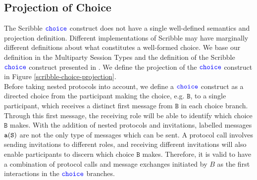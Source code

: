\documentclass[12pt,twoside]{report}
\begin{document}


 


\subsection{Projection of Choice}\label{scr-choice-projection}

The Scribble ${\color{blue}\mathtt{choice}}$ construct does not have a single well-defined semantics and projection definition. Different implementations of Scribble may have marginally different definitions about what constitutes a well-formed choice.  We base our definition in the Multiparty Session Types\cite{gentleintrotompst} and the definition of the Scribble ${\color{blue}\mathtt{choice}}$ construct presented in \cite{featherweight}. We define the projection of the ${\color{blue}\mathtt{choice}}$ construct in Figure \ref{scribble-choice-projection}.\\


Before taking nested protocols into account, we define a ${\color{blue}\mathtt{choice}}$ construct as a directed choice from the participant making the choice, e.g. $\mathtt{B}$, to a single participant, which receives a distinct first message from $\mathtt{B}$ in each choice branch. Through this first message, the receiving role will be able to identify which choice $\mathtt{B}$ makes. With the addition of nested protocols and invitations, labelled messages $\mathtt{a}(\mathtt{S})$ are not the only type of messages which can be sent. A protocol call involves sending invitations to different roles, and receiving different invitations will also enable participants to discern which choice $\mathtt{B}$ makes. Therefore, it is valid to have a combination of protocol calls and message exchanges initiated by $B$ as the first interactions in the ${\color{blue}\mathtt{choice}}$ branches.\\
\end{document}
